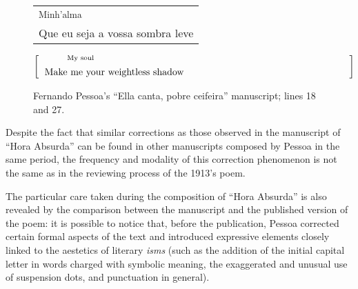 \begin{paper}
\begin{figure}[H]
    \begin{center}
    \begin{tabular}{p{}}
        \hspace{1em} \textsuperscript{Minh'alma}\\
        Que eu seja a vossa sombra leve\\
    \end{tabular}
    \end{center}
    
    \begin{center}
    \begin{equation*}
	\left[\begin{tabular}{p{.9\textwidth}}
        \text{\hspace{2em} \textsuperscript{My soul}}\\
        \text{Make me your weightless shadow}\\
	\end{tabular}\right]
    \end{equation*}
    \end{center}


\subfigure[Line 27]{
    \centering\small
    \hspace{\textwidth}
    \label{fig:defenu5b}
}

    \caption{Fernando Pessoa's ``Ella canta, pobre ceifeira'' manuscript; lines 18 and 27.\protect\footnotemark} 
    \label{fig:defenu5}
\end{figure}

Despite the fact that similar corrections as those observed in the
manuscript of ``Hora Absurda'' can be found in other manuscripts
composed by Pessoa in the same period, the frequency and modality of
this correction phenomenon is not the same as in the reviewing process
of the 1913's poem.

The particular care taken during the composition of ``Hora Absurda'' is
also revealed by the comparison between the manuscript and the published
version of the poem: it is possible to notice that, before the
publication, Pessoa corrected certain formal aspects of the text and
introduced expressive elements closely linked to the aestetics of
literary \emph{isms} (such as the addition of the initial capital letter
in words charged with symbolic meaning, the exaggerated and unusual use
of suspension dots, and punctuation in general).


\end{paper}
